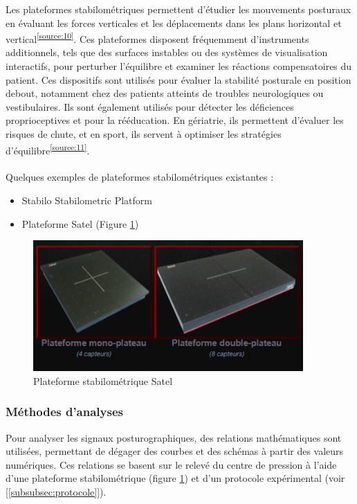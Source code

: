 Les plateformes stabilométriques permettent d'étudier les mouvements posturaux en évaluant les forces verticales et les déplacements dans les plans horizontal et vertical\textsuperscript{\ref{source:10}}. 
Ces plateformes disposent fréquemment d’instruments additionnels, tels que des surfaces instables ou des systèmes de visualisation interactifs, pour perturber l'équilibre et examiner les réactions compensatoires du patient. 
Ces dispositifs sont utilisés pour évaluer la stabilité posturale en position debout, notamment chez des patients atteints de troubles neurologiques ou vestibulaires. 
Ils sont également utilisés pour détecter les déficiences proprioceptives et pour la rééducation.
En gériatrie, ils permettent d'évaluer les risques de chute, et en sport, ils servent à optimiser les stratégies d'équilibre\textsuperscript{\ref{source:11}}. 
\\ \\
Quelques exemples de plateformes stabilométriques existantes : 
\begin{itemize}
    \item Stabilo Stabilometric Platform 
    \item Plateforme  Satel (Figure \ref{fig:satel})
\end{itemize}

\begin{figure}[H]
    \centering
    \includegraphics[height=5cm]{images/pression_plantaire/satel.png}
    \caption{Plateforme stabilométrique Satel}\label{fig:satel}
\end{figure}
 
\subsubsection{Méthodes d’analyses}

Pour analyser les signaux posturographiques, des relations mathématiques sont utilisées, permettant de dégager des courbes et des schémas à partir des valeurs numériques. 
Ces relations se basent sur le relevé du centre de pression à l’aide d’une plateforme stabilométrique (figure \ref{fig:satel}) et d’un protocole expérimental (voir [\ref{subsubsec:protocole}]).

